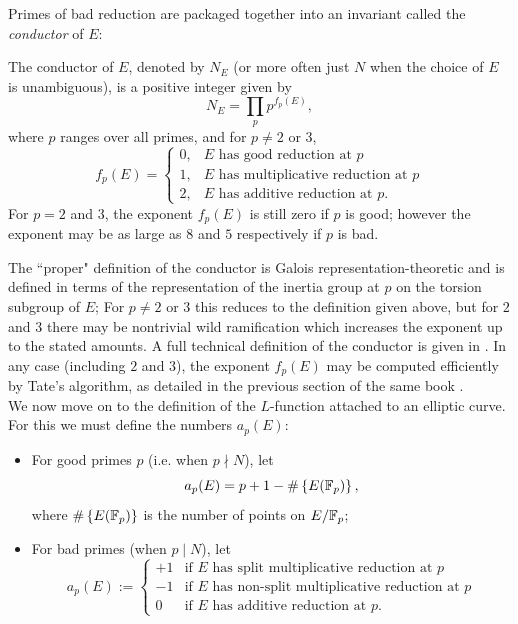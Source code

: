 \documentclass[10pt]{article}
\newcommand{\EFp}{E(\Fp)}
\begin{document}
Primes of bad reduction are packaged together into an invariant called the {\it conductor} of $E$:
\begin{definition}
The conductor of $E$, denoted by $N_E$ (or more often just $N$ when the choice of $E$ is unambiguous), is a positive integer given by
\begin{equation}
N_E = \prod_{p} p^{f_p(E)},
\end{equation}
where $p$ ranges over all primes, and for $p \ne 2$ or $3$,
\begin{equation}
f_p(E) = \begin{cases} 0, & \text{$E$ has good reduction at $p$} \\ 1, & \text{$E$ has multiplicative reduction at $p$} \\ 2, & \text{$E$ has additive reduction at $p$.}\end{cases}
\end{equation}
For $p=2$ and $3$, the exponent $f_p(E)$ is still zero if $p$ is good; however the exponent may be as large as $8$ and $5$ respectively if $p$ is bad.
\end{definition}
The ``proper" definition of the conductor is Galois representation-theoretic and is defined in terms of the representation of the inertia group at $p$ on the torsion subgroup of $E$; For $p\ne 2$ or $3$ this reduces to the definition given above, but for $2$ and $3$ there may be nontrivial wild ramification which increases the exponent up to the stated amounts. A full technical definition of the conductor is given in \cite[pp. 379-396]{Sil-1994}. In any case (including $2$ and $3$), the exponent $f_p(E)$ may be computed efficiently by Tate's algorithm, as detailed in the previous section of the same book \cite[pp. 361-379]{Sil-1994}. \\

We now move on to the definition of the $L$-function attached to an elliptic curve. For this we must define the numbers $a_p(E)$:
\begin{definition}\label{def:a_p} \mbox{}
\begin{itemize}
\item For good primes $p$ (i.e. when $p \nmid N$), let
\begin{equation}
a_p(E) = p+1-\#\set{\EFp},
\end{equation}
where $\#\set{\EFp}$ is the number of points on $E/\mathbb{F}_p$;
\item For bad primes (when $p \mid N$), let
\begin{equation}
a_p(E) := \begin{cases}
+1 & \text{if $E$ has split multiplicative reduction at $p$} \\
-1 & \text{if $E$ has non-split multiplicative reduction at $p$} \\
0 & \text{if $E$ has additive reduction at $p$.}
\end{cases}
\end{equation}
\end{itemize}
\end{definition}
\end{document}
